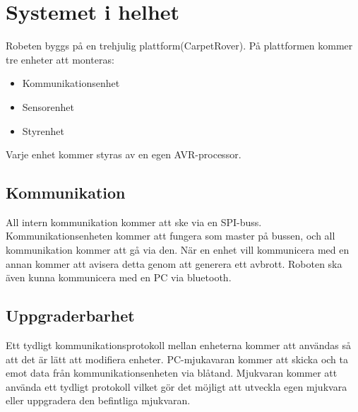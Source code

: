 \section{Systemet i helhet}
Robeten byggs på en trehjulig plattform(CarpetRover). På plattformen kommer tre enheter att monteras:
\begin{itemize}
        \item Kommunikationsenhet
        \item Sensorenhet
        \item Styrenhet
\end{itemize}
Varje enhet kommer styras av en egen AVR-processor.

\subsection{Kommunikation}
All intern kommunikation kommer att ske via en SPI-buss. Kommunikationsenheten kommer att fungera som master på bussen, och all kommunikation kommer att gå via den. När en enhet vill kommunicera med en annan kommer att avisera detta genom att generera ett avbrott. 
Roboten ska även kunna kommunicera med en PC via bluetooth.

\subsection{Uppgraderbarhet}
Ett tydligt kommunikationsprotokoll mellan enheterna kommer att användas så att det är lätt att modifiera enheter. PC-mjukavaran kommer att skicka och ta emot data från kommunikationsenheten via blåtand.
Mjukvaran kommer att använda ett tydligt protokoll vilket gör det möjligt att utveckla egen mjukvara eller uppgradera den befintliga mjukvaran.

